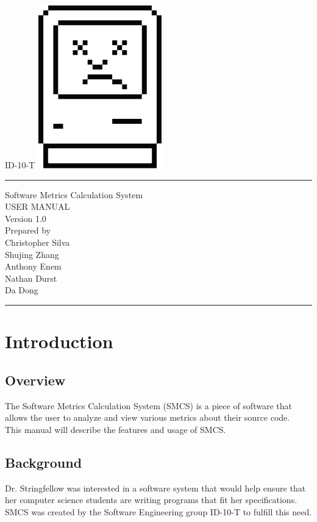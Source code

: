 \documentclass{scrreprt}
\author{Christopher Silva}
\date{}
\def\myversion{1.0 }
\begin{document}
	\begin{titlepage}
		\flushright
		\LARGE{ID-10-T}
		\includegraphics[scale=0.08]{logo.png}
		\rule{16cm}{5pt}\vskip1cm
		\centering
		\Huge{Software Metrics Calculation System}\\
		\vspace{2cm}
		\Huge{USER MANUAL}\\
		\vspace{2cm}
		\LARGE{Version \myversion\\}
		\vspace{2cm}
		Prepared by\\
	    Christopher Silva\\
	    Shujing Zhang\\
		Anthony Enem\\
		Nathan Durst\\
		Da Dong\\
		\vfill
		\rule{16cm}{5pt}
	\end{titlepage}
	\tableofcontents
	\chapter{Introduction}
	
	\section{Overview}
	The Software Metrics Calculation System (SMCS) is a piece of software that allows the user to analyze and view various metrics about their source code. \\
	This manual will describe the features and usage of SMCS.
	
	\section{Background}
	Dr. Stringfellow was interested in a software system that would help ensure that her computer science students are writing programs that fit her specifications.
	SMCS was created by the Software Engineering group ID-10-T to fulfill this need.
	
\end{document}
